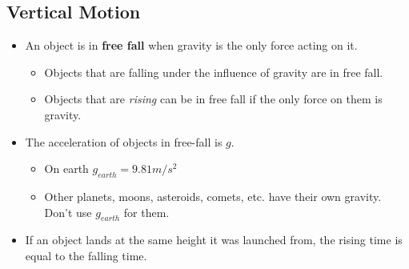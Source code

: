 \documentclass[letterpaper, 12pt]{article}
\begin{document}
\subsection*{Vertical Motion}
\begin{itemize}
	\item An object is in \textbf{free fall} when gravity is the only force acting on it.  
	\begin{itemize}
		\item Objects that are falling under the influence of gravity are in free fall.
		\item Objects that are \textit{rising} can be in free fall if the only force on them is gravity.
	\end{itemize}
	\item The acceleration of objects in free-fall is $g$.  
		\begin{itemize} 
			\item On earth $g_{earth} = 9.81 m/s^2$ 	
			\item Other planets, moons, asteroids, comets, etc. have their own gravity.  Don't use $g_{earth}$ for them. 
		\end{itemize}
	\item If an object lands at the same height it was launched from, the rising time is equal to the falling time. 
	
\end{itemize}
 
\end{document}
